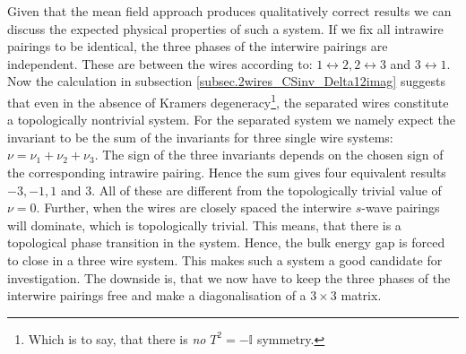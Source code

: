 Given that the mean field approach produces qualitatively correct results we can discuss the expected physical properties of such a system. If we fix all intrawire pairings to be identical, the three phases of the interwire pairings are independent. These are between the wires according to: $1 \leftrightarrow 2, 2 \leftrightarrow 3$ and $3 \leftrightarrow 1$. Now the calculation in subsection \ref{subsec.2wires_CSinv_Delta12imag} suggests that even in the absence of Kramers degeneracy\footnote{Which is to say, that there is \textit{no} $T^2 = -\mathbb{I}$ symmetry.}, the separated wires constitute a topologically nontrivial system. For the separated system we namely expect the invariant to be the sum of the invariants for three single wire systems: $\nu = \nu_1 + \nu_2 + \nu_3$. The sign of the three invariants depends on the chosen sign of the corresponding intrawire pairing. Hence the sum gives four equivalent results $-3, -1, 1$ and $3$. All of these are different from the topologically trivial value of $\nu = 0$. Further, when the wires are closely spaced the interwire $s$-wave pairings will dominate, which is topologically trivial. This means, that there is a topological phase transition in the system. Hence, the bulk energy gap is forced to close in a three wire system. This makes such a system a good candidate for investigation. The downside is, that we now have to keep the three phases of the interwire pairings free and make a diagonalisation of a $3 \times 3$ matrix.  


